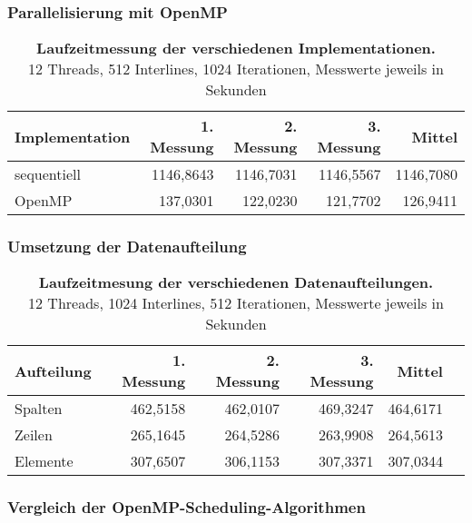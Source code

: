 \documentclass[a4paper,12pt]{scrartcl}
\begin{document}
\parindent0mm
\setcapindent{0pt}
\subsubsection*{Parallelisierung mit OpenMP}
\begin{table}
\begin{tabular}{|l|r|r|r|r|}
\hline
Implementation&1. Messung&2. Messung&3. Messung&Mittel\\
\hline
sequentiell&	1146,8643&	1146,7031&	1146,5567&	1146,7080\\
\hline
OpenMP	&137,0301	&122,0230	&121,7702&	126,9411\\
\hline
\end{tabular}
\caption{\textbf{Laufzeitmessung der verschiedenen Implementationen.}\\ 12 Threads, 512 Interlines, 1024 Iterationen, Messwerte jeweils in Sekunden}
\end{table}
\subsubsection*{Umsetzung der Datenaufteilung}
\begin{table}[!h]
\begin{tabular}{|l|r|r|r|r|r|}
\hline
Aufteilung&1. Messung&2. Messung&3. Messung&Mittel\\
\hline
Spalten	&462,5158	&462,0107	&469,3247	&464,6171\\
\hline
Zeilen	&265,1645	&264,5286	&263,9908	&264,5613\\
\hline
Elemente	&307,6507	&306,1153	&307,3371	&307,0344\\
\hline
\end{tabular}
\caption{\textbf{Laufzeitmesung der verschiedenen Datenaufteilungen.}\\ 12 Threads, 1024 Interlines, 512 Iterationen, Messwerte jeweils in Sekunden}
\end{table}

\subsubsection*{Vergleich der OpenMP-Scheduling-Algorithmen}
\end{document}
